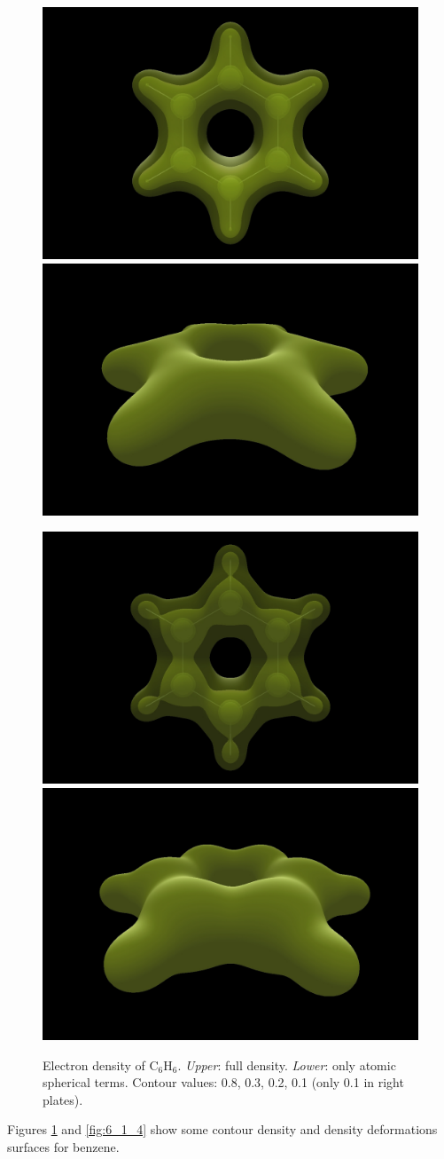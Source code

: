 \documentclass[10pt]{article}
\begin{document}
\begin{figure}[H]
\begin{center}
\includegraphics[width=.33\linewidth]{C6H6-pVTZ-d-tot.png}
\hspace*{5mm}
\includegraphics[width=.33\linewidth]{C6H6-pVTZ-d-tot_b.png}

\vspace*{7mm}
\includegraphics[width=.33\linewidth]{C6H6-pVTZ-d-l0.png}
\hspace*{5mm}
\includegraphics[width=.33\linewidth]{C6H6-pVTZ-d-l0_b.png}
\end{center}
\caption[Electron density of C$_6$H$_6$]{ Electron density of C$_6$H$_6$. {\it Upper}: full density. {\it
Lower}: only atomic spherical terms. Contour values: 0.8, 0.3, 0.2, 0.1 (only
0.1 in right plates).
\label{fig:6_1_3}}
\end{figure}

Figures \ref{fig:6_1_3} and \ref{fig:6_1_4} show some contour density and
density deformations surfaces for benzene.
\end{document}
